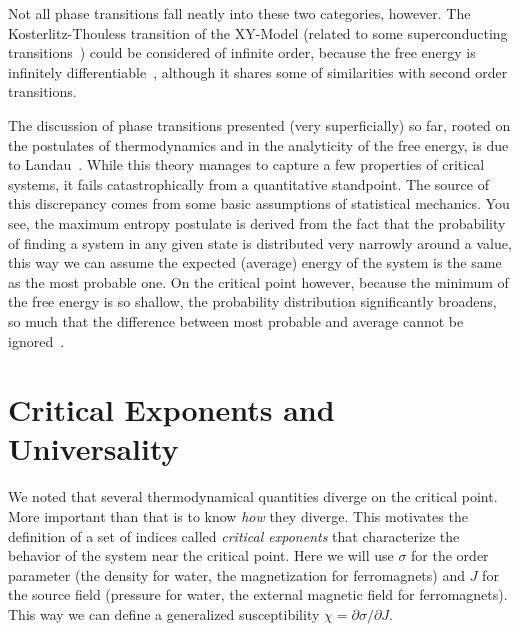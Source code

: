 Not all phase transitions fall neatly into these two categories, however. The
Kosterlitz-Thouless transition of the XY-Model (related to some superconducting
transitions~\cite{Resnick1981}) could be considered of infinite order, because
the free energy is infinitely differentiable~\cite{Kosterlitz1973}, although it
shares some of similarities with second order transitions.

The discussion of phase transitions presented (very superficially) so far,
rooted on the postulates of thermodynamics and in the analyticity of the free
energy, is due to Landau~\cite{Landau1969}. While this theory manages to
capture a few properties of critical systems, it fails catastrophically from a
quantitative standpoint. The source of this discrepancy comes from some basic
assumptions of statistical mechanics. You see, the maximum entropy postulate is
derived from the fact that the probability of finding a system in any given
state is distributed very narrowly around a value, this way we can assume the
expected (average) energy of the system is the same as the most probable one.
On the critical point however, because the minimum of the free energy is so
shallow, the probability distribution significantly broadens, so much that the
difference between most probable and average cannot be
ignored~\cite{Callen1985}.



\section{Critical Exponents and Universality}
\label{sec:universality}
\newcommand{\op}{\sigma}
\newcommand{\sfi}{J}

We noted that several thermodynamical quantities diverge on the critical point.
More important than that is to know \textit{how} they diverge. This motivates
the definition of a set of indices called \textit{critical exponents} that
characterize the behavior of the system near the critical point. Here we will
use $\op$ for the order parameter (the density for water, the magnetization for
ferromagnets) and $\sfi$ for the source field (pressure for water, the external
magnetic field for ferromagnets). This way we can define a generalized
susceptibility $\chi=\partial\op/\partial \sfi$.


